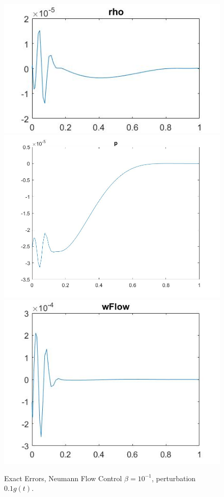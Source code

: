 \documentclass[11pt, a4paper]{article}
\theoremstyle{definition}
\begin{document}
\begin{figure}[h]
	\includegraphics[scale=0.3]{KalCreatewFlow7L2Linf1.jpg}
	\includegraphics[scale=0.2]{KalCreatewFlow7L2Linf2.jpg}
	\includegraphics[scale=0.25]{KalCreatewFlow7L2Linf3.jpg}
	\caption{Exact Errors, Neumann Flow Control $\beta = 10^{-1}$, perturbation $0.1g(t)$.}
	\label{FigKal1}
\end{figure}
\end{document}

